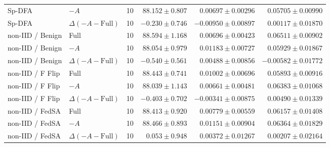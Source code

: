 \begin{table}[t]
\begin{tabular}{llrrrr}
Sp-DFA & $-A$ & 10 & $88.152 \pm 0.807$ & $0.00697 \pm 0.00296$ & $0.05705 \pm 0.00990$ \\
Sp-DFA & $\Delta(-A-\mathrm{Full})$ & 10 & $-0.230 \pm 0.746$ & $-0.00950 \pm 0.00897$ & $0.00117 \pm 0.01870$ \\
non-IID / Benign & Full & 10 & $88.594 \pm 1.168$ & $0.00696 \pm 0.00423$ & $0.06511 \pm 0.00902$ \\
non-IID / Benign & $-A$ & 10 & $88.054 \pm 0.979$ & $0.01183 \pm 0.00727$ & $0.05929 \pm 0.01867$ \\
non-IID / Benign & $\Delta(-A-\mathrm{Full})$ & 10 & $-0.540 \pm 0.561$ & $0.00488 \pm 0.00856$ & $-0.00582 \pm 0.01772$ \\
non-IID / F Flip & Full & 10 & $88.443 \pm 0.741$ & $0.01002 \pm 0.00696$ & $0.05893 \pm 0.00916$ \\
non-IID / F Flip & $-A$ & 10 & $88.039 \pm 1.143$ & $0.00661 \pm 0.00481$ & $0.06383 \pm 0.01068$ \\
non-IID / F Flip & $\Delta(-A-\mathrm{Full})$ & 10 & $-0.403 \pm 0.702$ & $-0.00341 \pm 0.00875$ & $0.00490 \pm 0.01339$ \\
non-IID / FedSA & Full & 10 & $88.413 \pm 0.920$ & $0.00779 \pm 0.00559$ & $0.06157 \pm 0.01408$ \\
non-IID / FedSA & $-A$ & 10 & $88.466 \pm 0.893$ & $0.01151 \pm 0.00904$ & $0.06364 \pm 0.01829$ \\
non-IID / FedSA & $\Delta(-A-\mathrm{Full})$ & 10 & $0.053 \pm 0.948$ & $0.00372 \pm 0.01267$ & $0.00207 \pm 0.02164$ \\
\bottomrule
\end{tabular}
\end{table}

